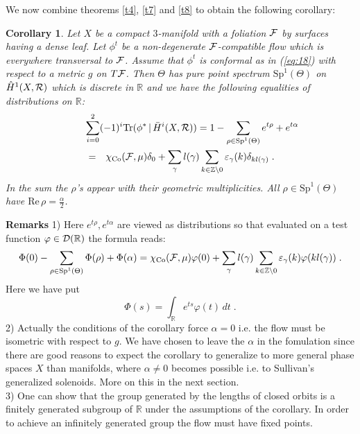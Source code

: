 \documentclass[11pt,leqno]{article}
\newcommand{\Co}{\mathrm{Co}}
\newcommand{\Sp}{\mathrm{Sp}}
\newcommand{\R}{{\mathbb{R}}}
\newcommand{\Z}{{\mathbb{Z}}}
\newcommand{\RRe}{\mathrm{Re}\,}
\newcommand{\Tr}{\mathrm{Tr}}
\newcommand{\Dh}{{\cal D}}
\newcommand{\Fh}{{\cal F}}
\newcommand{\Rh}{{\cal R}}
\newcommand{\oH}{\bar{H}}
\newcommand{\ohne}{\setminus}
\newcommand{\tei}{\, | \,}
\newtheorem{cor}[theorem]{Corollary}
\begin{document}
We now combine theorems \ref{t4}, \ref{t7} and \ref{t8} to obtain the following corollary:

\begin{cor}
  \label{t9}
Let $X$ be a compact $3$-manifold with a foliation $\Fh$ by surfaces having a dense leaf. Let $\phi^t$ be a non-degenerate $\Fh$-compatible flow which is everywhere transversal to $\Fh$. Assume that $\phi^t$ is conformal as in (\ref{eq:18}) with respect to a metric $g$ on $T\Fh$. Then $\Theta$ has pure point spectrum $\Sp^1 (\Theta)$ on $\hat{H}^1 (X,\Rh)$ which is discrete in $\R$ and we have the following equalities of distributions on $\R$:
\begin{eqnarray}
  \label{eq:22}
  \lefteqn{\sum^2_{i=0} (-1)^i \Tr (\phi^* \tei \oH^i (X, \Rh)) = 1 - \sum_{\rho \in \Sp^1 (\Theta)} e^{t\rho} + e^{t\alpha}} \\
& = & \chi_{\Co} (\Fh , \mu) \delta_0 + \sum_{\gamma} l (\gamma) \sum_{k \in \Z \ohne 0} \varepsilon_{\gamma} (k) \delta_{kl (\gamma)} \; . \nonumber
\end{eqnarray}
In the sum the $\rho$'s appear with their geometric multiplicities. All $\rho \in \Sp^1 (\Theta)$ have $\RRe \rho = \frac{\alpha}{2}$.
\end{cor}

{\bf Remarks} 1) Here $e^{t\rho} , e^{t \alpha}$ are viewed as distributions so that evaluated on a test function $\varphi \in \Dh (\R)$ the formula reads:
\begin{equation}
  \label{eq:23}
\Phi (0) - \sum\limits_{\rho \in \Sp^1 (\Theta)} \Phi (\rho) + \Phi (\alpha) = \chi_{\Co} (\Fh , \mu) \varphi (0) + \sum\limits_{\gamma} l (\gamma) \sum\limits_{k \in \Z \ohne 0} \varepsilon_{\gamma} (k) \varphi (k l (\gamma)) \; .
\end{equation}
Here we have put
\[
\Phi (s) = \int_{\R} e^{ts} \varphi (t) \, dt \; .
\]
2) Actually the conditions of the corollary force $\alpha = 0$ i.e. the flow must be isometric with respect to $g$. We have chosen to leave the $\alpha$ in the fomulation since there are good reasons to expect the corollary to generalize to more general phase spaces $X$ than manifolds, where $\alpha \neq 0$ becomes possible i.e. to Sullivan's generalized solenoids. More on this in the next section.\\
3) One can show that the group generated by the lengths of closed orbits is a finitely generated subgroup of $\R$ under the assumptions of the corollary. In order to achieve an infinitely generated group the flow must have fixed points.
\end{document}
